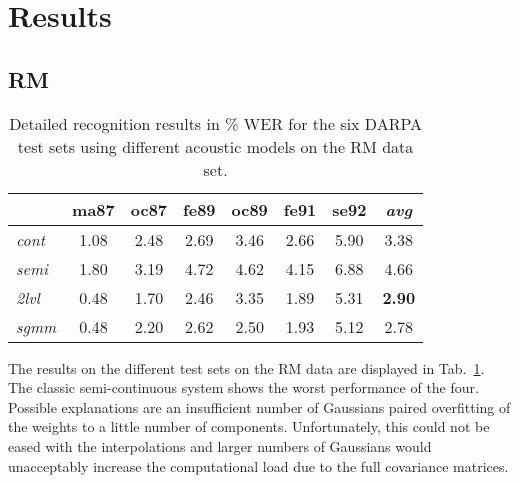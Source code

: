 \documentclass{article}
\begin{document}

\section{Results}

\subsection{RM}

\begin{table}%
\begin{center}
\begin{tabular}{|l||c|c|c|c|c|c||c|}
\hline
~               & ma87 & oc87 & fe89 & oc89 & fe91 & se92 & {\em avg}  \\ \hline\hline
{\em cont} &  1.08 &  2.48 &  2.69 &  3.46 &  2.66 &  5.90 & 3.38 \\ \hline
{\em semi} &  1.80 &  3.19 &  4.72 &  4.62 &  4.15 &  6.88 & 4.66 \\ \hline 
{\em 2lvl} &  0.48 &  1.70 &  2.46 &  3.35 &  1.89 &  5.31 & {\bf 2.90} \\ \hline
{\em sgmm} &  0.48 &  2.20 &  2.62 &  2.50 &  1.93 &  5.12 & 2.78 \\ \hline
\end{tabular}
\end{center}
\caption{\label{tab:res_rm}
Detailed recognition results in \% WER for the six DARPA test sets using 
different acoustic models on the RM data set.
}
\end{table}

The results on the different test sets on the RM data are displayed in 
Tab.~\ref{tab:res_rm}. The classic semi-continuous system shows the worst 
performance of the four. Possible explanations are an insufficient number
of Gaussians paired overfitting of the weights to a little number of 
components. Unfortunately, this could not be eased with the interpolations
and larger numbers of Gaussians would unacceptably increase the computational 
load due to the full covariance matrices.
\end{document}
